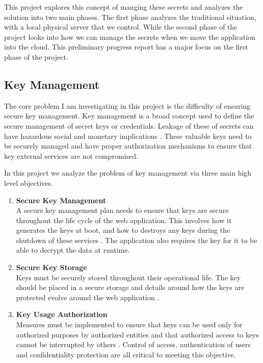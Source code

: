 \documentclass[11pt, a4paper, notitlepage]{article}
\begin{document}
This project explores this concept of manging these secrets and analyzes the solution into two main phases. The first phase analyzes the traditional situation, with a local physical server that we control. While the second phase of the project looks into how we can manage the secrets when we move the application into the cloud. This preliminary progress report has a major focus on the first phase of the project. 

\subsection*{Key Management}
The core problem I am investigating in this project is the difficulty of ensuring secure key management. Key management is a broad concept used to define the secure management of secret keys or credentials. Leakage of these of secrets can have hazardous social and monetary implications \cite{huang2003web}. These valuable keys need to be securely managed and have proper authorization mechanisms to ensure that key external services are not compromised. 

In this project we analyze the problem of key management via three main high level objectives.

\begin{enumerate}
\item \textbf{Secure Key Management} \\
A secure key management plan needs to ensure that keys are secure throughout the life cycle of the web application. This involves how it generates the keys at boot, and how to destroys any keys during the shutdown of these services \cite{entrprise-guide}. The application also requires the key for it to be able to decrypt the data at runtime. 

\item \textbf{Secure Key Storage} \\
Keys must be securely stored throughout their operational life. The key should be placed in a secure storage and details around how the keys are protected evolve around the web application  \cite{entrprise-guide}. 

\item \textbf{Key Usage Authorization} \\
Measures must be implemented to ensure that keys can be used only for authorized  purposes by authorized entities and that authorized access to keys cannot be interrupted by others  \cite{entrprise-guide}. Control of access, authentication of users and confidentiality protection are all critical to meeting this objective.
\end{enumerate}
\end{document}
